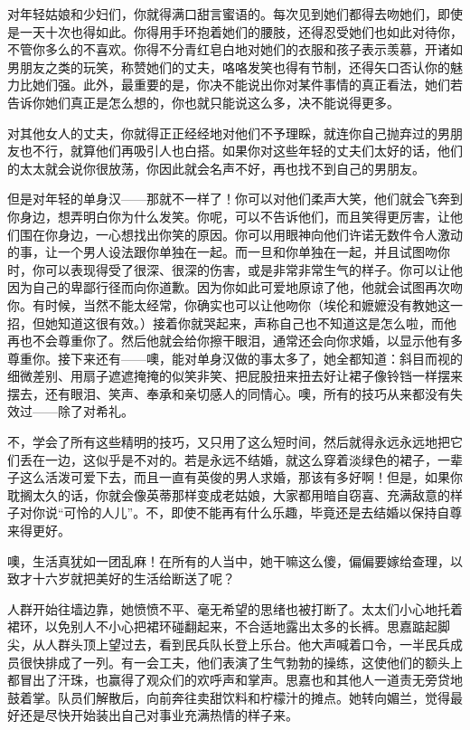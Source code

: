 \par 对年轻姑娘和少妇们，你就得满口甜言蜜语的。每次见到她们都得去吻她们，即使是一天十次也得如此。你得用手环抱着她们的腰肢，还得忍受她们也如此对待你，不管你多么的不喜欢。你得不分青红皂白地对她们的衣服和孩子表示羡慕，开诸如男朋友之类的玩笑，称赞她们的丈夫，咯咯发笑也得有节制，还得矢口否认你的魅力比她们强。此外，最重要的是，你决不能说出你对某件事情的真正看法，她们若告诉你她们真正是怎么想的，你也就只能说这么多，决不能说得更多。
\par 对其他女人的丈夫，你就得正正经经地对他们不予理睬，就连你自己抛弃过的男朋友也不行，就算他们再吸引人也白搭。如果你对这些年轻的丈夫们太好的话，他们的太太就会说你很放荡，你因此就会名声不好，再也找不到自己的男朋友。
\par 但是对年轻的单身汉——那就不一样了！你可以对他们柔声大笑，他们就会飞奔到你身边，想弄明白你为什么发笑。你呢，可以不告诉他们，而且笑得更厉害，让他们围在你身边，一心想找出你笑的原因。你可以用眼神向他们许诺无数件令人激动的事，让一个男人设法跟你单独在一起。而一旦和你单独在一起，并且试图吻你时，你可以表现得受了很深、很深的伤害，或是非常非常生气的样子。你可以让他因为自己的卑鄙行径而向你道歉。因为你如此可爱地原谅了他，他就会试图再次吻你。有时候，当然不能太经常，你确实也可以让他吻你（埃伦和嬷嬷没有教她这一招，但她知道这很有效。）接着你就哭起来，声称自己也不知道这是怎么啦，而他再也不会尊重你了。然后他就会给你擦干眼泪，通常还会向你求婚，以显示他有多尊重你。接下来还有——噢，能对单身汉做的事太多了，她全都知道：斜目而视的细微差别、用扇子遮遮掩掩的似笑非笑、把屁股扭来扭去好让裙子像铃铛一样摆来摆去，还有眼泪、笑声、奉承和亲切感人的同情心。噢，所有的技巧从来都没有失效过——除了对希礼。
\par 不，学会了所有这些精明的技巧，又只用了这么短时间，然后就得永远永远地把它们丢在一边，这似乎是不对的。若是永远不结婚，就这么穿着淡绿色的裙子，一辈子这么活泼可爱下去，而且一直有英俊的男人求婚，那该有多好啊！但是，如果你耽搁太久的话，你就会像英蒂那样变成老姑娘，大家都用暗自窃喜、充满敌意的样子对你说“可怜的人儿”。不，即使不能再有什么乐趣，毕竟还是去结婚以保持自尊来得更好。
\par 噢，生活真犹如一团乱麻！在所有的人当中，她干嘛这么傻，偏偏要嫁给查理，以致才十六岁就把美好的生活给断送了呢？
\par 人群开始往墙边靠，她愤愤不平、毫无希望的思绪也被打断了。太太们小心地托着裙环，以免别人不小心把裙环碰翻起来，不合适地露出太多的长裤。思嘉踮起脚尖，从人群头顶上望过去，看到民兵队长登上乐台。他大声喊着口令，一半民兵成员很快排成了一列。有一会工夫，他们表演了生气勃勃的操练，这使他们的额头上都冒出了汗珠，也赢得了观众们的欢呼声和掌声。思嘉也和其他人一道责无旁贷地鼓着掌。队员们解散后，向前奔往卖甜饮料和柠檬汁的摊点。她转向媚兰，觉得最好还是尽快开始装出自己对事业充满热情的样子来。

